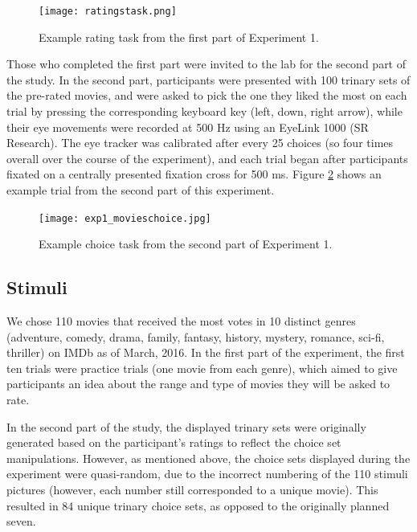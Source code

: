 \documentclass[11pt,a4paper]{article}
\begin{document}
\begin{figure}
\captionsetup{justification=centering}
\centering
\caption{Example rating task from the first part of Experiment 1. }
\texttt{[image: ratingstask.png]}
\label{fig:ratingstask}
\end{figure}

Those who completed the first part were invited to the lab for the second part of the study. In the second part, participants were presented with 100 trinary sets of the pre-rated movies, and were asked to pick the one they liked the most on each trial by pressing the corresponding keyboard key (left, down, right arrow), while their eye movements were recorded at 500 Hz using an EyeLink 1000 (SR Research). The eye tracker was calibrated after every 25 choices (so four times overall over the course of the experiment), and each trial began after participants fixated on a centrally presented fixation cross for 500 ms. Figure \ref{fig:exp1_movieschoice} shows an example trial from the second part of this experiment.

\begin{figure}
\captionsetup{justification=centering}
\centering
\caption{Example choice task from the second part of Experiment 1. }
\texttt{[image: exp1\_movieschoice.jpg]}
\label{fig:exp1_movieschoice}
\end{figure}



\subsection{Stimuli}

We chose 110 movies that received the most votes in 10 distinct genres (adventure, comedy, drama, family, fantasy, history, mystery, romance, sci-fi, thriller) on IMDb as of March, 2016. In the first part of the experiment, the first ten trials were practice trials (one movie from each genre), which aimed to give participants an idea about the range and type of movies they will be asked to rate. 

In the second part of the study, the displayed trinary sets were originally generated based on the participant's ratings to reflect the choice set manipulations. However, as mentioned above, the choice sets displayed during the experiment were quasi-random, due to the incorrect numbering of the 110 stimuli pictures (however, each number still corresponded to a unique movie). This resulted in 84 unique trinary choice sets, as opposed to the originally planned seven. 
\end{document}
